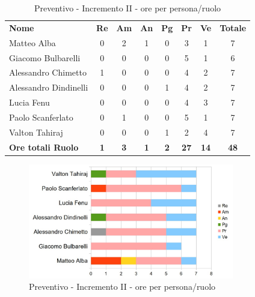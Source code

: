 	\begin{table} [h!]
	\begin{center}
		\begin{tabular} { m{3.5cm} c c c c c c c }
			\rowcolor{lightgray}
			\textbf{Nome} & \textbf{Re} & \textbf{Am} & \textbf{An} & \textbf{Pg} & \textbf{Pr} & \textbf{Ve} & \textbf{Totale} \\
			Matteo Alba & 0 & 2 & 1 & 0 & 3 & 1 & 7 \\
			Giacomo Bulbarelli & 0 & 0 & 0 & 0 & 5 & 1 & 6 \\
			Alessandro Chimetto & 1 & 0 & 0 & 0 & 4 & 2 & 7 \\
			Alessandro Dindinelli & 0 & 0 & 0 & 1 & 4 & 2 & 7 \\
			Lucia Fenu & 0 & 0 & 0 & 0 & 4 & 3 & 7 \\
			Paolo Scanferlato & 0 & 1 & 0 & 0 & 5 & 1 & 7 \\
			Valton Tahiraj & 0 & 0 & 0 & 1 & 2 & 4 & 7 \\
			\textbf{Ore totali Ruolo} & \textbf{1} & \textbf{3} & \textbf{1} & \textbf{2} & \textbf{27}& \textbf{14} & \textbf{48}
		\end{tabular}
		\caption{Preventivo - Incremento II - ore per persona/ruolo}
	\end{center}
\end{table}
\begin{figure} [h!]
	\centering
	\includegraphics[width=0.8\textwidth]{res/img/grafici/Incremento2Ore.jpg}
	\caption{Preventivo - Incremento II - ore per persona/ruolo} 
\end{figure}

\newpage

